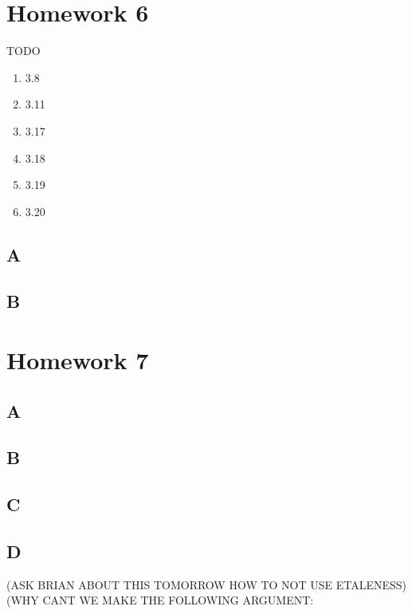 \documentclass[12pt]{article}
\begin{document}
\section{Homework 6}
TODO
\begin{enumerate}
\item 3.8
\item 3.11
\item 3.17
\item 3.18
\item 3.19
\item 3.20
\end{enumerate}

\subsection{A}

\subsection{B}

\section{Homework 7}

\subsection{A}

\subsection{B}

\subsection{C}

\subsection{D}

(ASK BRIAN ABOUT THIS TOMORROW HOW TO NOT USE ETALENESS)
(WHY CANT WE MAKE THE FOLLOWING ARGUMENT: 
\end{document}

